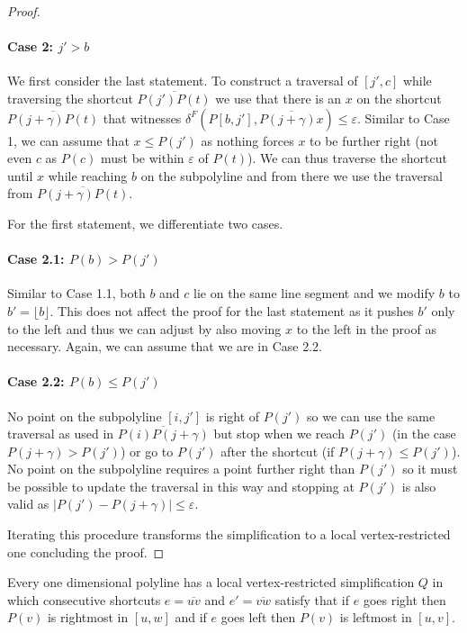 \begin{proof}
	\paragraph{Case 2: \(j' > b\)}
	We first consider the last statement. To construct a traversal of \([j', c]\) while traversing the shortcut \(\overline{P(j')P(t)}\) we use that there is an \(x\) on the shortcut \(\overline{P(j+\gamma)P(t)}\) that witnesses \(\delta^F(P[b, j'], \overline{P(j+\gamma)x}) \leq \varepsilon\). Similar to Case 1, we can assume that \(x \leq P(j')\) as nothing forces \(x\) to be further right (not even \(c\) as \(P(c)\) must be within \(\varepsilon\) of \(P(t)\)). We can thus traverse the shortcut until \(x\) while reaching \(b\) on the subpolyline and from there we use the traversal from \(\overline{P(j+\gamma)P(t)}\).

	For the first statement, we differentiate two cases.

	\paragraph{Case 2.1: \(P(b) > P(j')\)} 
	Similar to Case 1.1, both \(b\) and \(c\) lie on the same line segment and we modify \(b\) to \(b' = \lfloor b \rfloor\). This does not affect the proof for the last statement as it pushes \(b'\) only to the left and thus we can adjust by also moving \(x\) to the left in the proof as necessary. Again, we can assume that we are in Case 2.2.

	\paragraph{Case 2.2: \(P(b) \leq P(j')\)} 
	No point on the subpolyline \([i, j']\) is right of \(P(j')\) so we can use the same traversal as used in \(\overline{P(i)P(j+\gamma)}\) but stop when we reach \(P(j')\) (in the case \(P(j+\gamma) > P(j')\)) or go to \(P(j')\) after the shortcut (if \(P(j+\gamma) \leq P(j')\)). No point on the subpolyline requires a point further right than \(P(j')\) so it must be possible to update the traversal in this way and stopping at \(P(j')\) is also valid as \(|P(j') - P(j + \gamma)| \leq \varepsilon\).

	Iterating this procedure transforms the simplification to a local vertex-restricted one concluding the proof.
\end{proof}

\begin{corollary}\label{cor:local_extremal}
	Every one dimensional polyline has a local vertex-restricted simplification \(Q\) in which consecutive shortcuts \(e=\overline{uv}\) and \(e'=\overline{vw}\) satisfy that if \(e\) goes right then \(P(v)\) is rightmost in \([u, w]\) and if \(e\) goes left then \(P(v)\) is leftmost in \([u, v]\).
\end{corollary}

